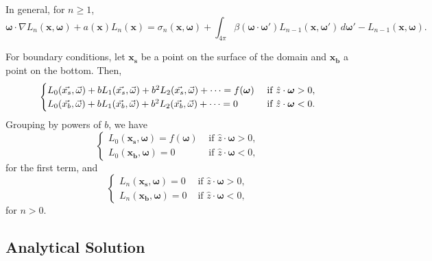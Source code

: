 \documentclass[ms,cpyr,lof,lot]{uathesis}
\renewcommand\vec\bm
\begin{document}
In general, for $n \geq 1$,
\begin{equation}
  \vec{\omega} \cdot \nabla L_n(\vec{x}, \vec{\omega}) + a(\vec{x})L_n(\vec{x})
  = \sigma_n(\vec{x}, \vec{\omega})
  + \int_{4\pi} \beta(\vec{\omega}\cdot\vec{\omega}') L_{n-1}(\vec{x}, \vec{\omega}')\,d\vec{\omega}' - L_{n-1}(\vec{x}, \vec{\omega}).
  \label{eqn:asymptotics_n}
\end{equation}

For boundary conditions, let $\vec{x_s}$ be a point on the surface of the domain and $\vec{x_b}$ a point on the bottom.
Then,
\begin{equation*}
  \begin{cases}
    \Lasyms = f(\vec{\omega}) &\mbox{ if } \hat{z}\cdot\vec{\omega} > 0, \\
    \Lasymb = 0 &\mbox{ if } \hat{z}\cdot\vec{\omega} < 0.
    \end{cases}
\end{equation*}
Grouping by powers of $b$, we have
\begin{equation}
  \begin{cases}
    L_0(\vec{x_s}, \vec{\omega}) = f(\vec{\omega}) &\mbox{ if } \hat{z}\cdot\vec{\omega} > 0, \\
    L_0(\vec{x_b}, \vec{\omega}) = 0 &\mbox{ if } \hat{z}\cdot\vec{\omega} < 0,
  \end{cases}
  \label{eqn:asymptotics_bc_0}
\end{equation}
for the first term, and
\begin{equation}
  \begin{cases}
    L_n(\vec{x_s}, \vec{\omega}) = 0 &\mbox{ if } \hat{z}\cdot\vec{\omega} > 0, \\
    L_n(\vec{x_b}, \vec{\omega}) = 0 &\mbox{ if } \hat{z}\cdot\vec{\omega} < 0,
  \end{cases}
  \label{eqn:asymptotics_bc_n}
\end{equation}
for $n > 0$.

\subsection{Analytical Solution}
\label{sec:asymptotic_sol}
\end{document}
